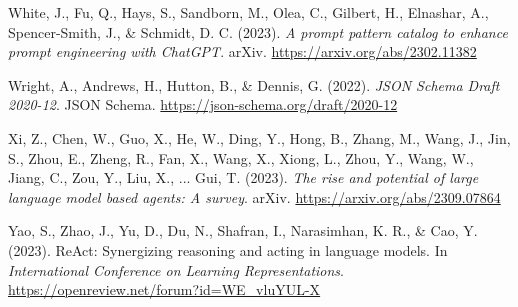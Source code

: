 \documentclass[11pt]{article}
\begin{document}
White, J., Fu, Q., Hays, S., Sandborn, M., Olea, C., Gilbert, H., Elnashar, A.,
Spencer-Smith, J., \& Schmidt, D. C. (2023). \textit{A prompt pattern catalog
to enhance prompt engineering with ChatGPT}. arXiv.
\url{https://arxiv.org/abs/2302.11382}

Wright, A., Andrews, H., Hutton, B., \& Dennis, G. (2022). \textit{JSON Schema
Draft 2020-12}. JSON Schema. \url{https://json-schema.org/draft/2020-12}

Xi, Z., Chen, W., Guo, X., He, W., Ding, Y., Hong, B., Zhang, M., Wang, J.,
Jin, S., Zhou, E., Zheng, R., Fan, X., Wang, X., Xiong, L., Zhou, Y., Wang, W.,
Jiang, C., Zou, Y., Liu, X., ... Gui, T. (2023). \textit{The rise and potential
of large language model based agents: A survey}. arXiv.
\url{https://arxiv.org/abs/2309.07864}

Yao, S., Zhao, J., Yu, D., Du, N., Shafran, I., Narasimhan, K. R., \& Cao, Y.
(2023). ReAct: Synergizing reasoning and acting in language models. In
\textit{International Conference on Learning Representations}.
\url{https://openreview.net/forum?id=WE_vluYUL-X}
\end{document}
